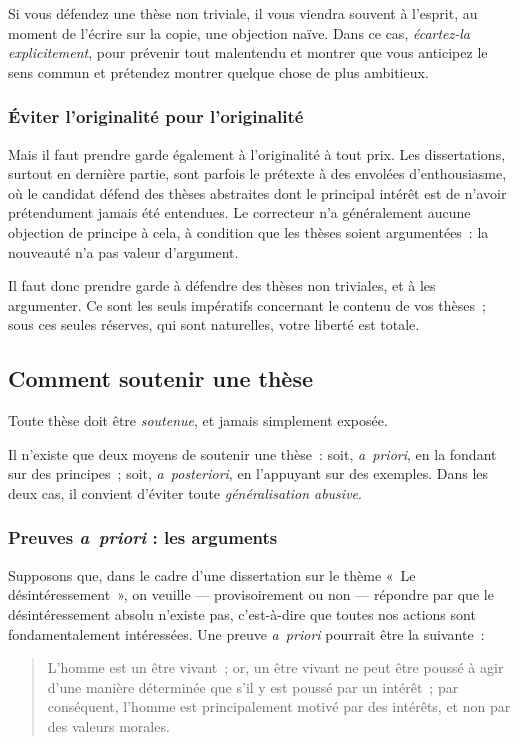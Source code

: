 \documentclass[a4paper]{article}
\begin{document}
Si vous défendez une thèse non triviale, il vous viendra souvent à
l'esprit, au moment de l'écrire sur la copie, une objection naïve. Dans
ce cas, \emph{écartez-la explicitement}, pour prévenir tout malentendu et
montrer que vous anticipez le sens commun et prétendez montrer quelque
chose de plus ambitieux.
\subsubsection{Éviter l'originalité pour l'originalité}
\label{sec-3-2-4}


Mais il faut prendre garde également à l'originalité à tout prix. Les
dissertations, surtout en dernière partie, sont parfois le prétexte à
des envolées d'enthousiasme, où le candidat défend des thèses abstraites
dont le principal intérêt est de n'avoir prétendument jamais été
entendues. Le correcteur n'a généralement aucune objection de principe à
cela, à condition que les thèses soient argumentées : la nouveauté n'a
pas valeur d'argument.

Il faut donc prendre garde à défendre des thèses non triviales, et à les
argumenter. Ce sont les seuls impératifs concernant le contenu de vos
thèses ; sous ces seules réserves, qui sont naturelles, votre liberté
est totale.
\subsection{Comment soutenir une thèse}
\label{sec-3-3}


Toute thèse doit être \emph{soutenue}, et jamais simplement exposée.

Il n'existe que deux moyens de soutenir une thèse : soit, \emph{a priori}, en
la fondant sur des principes ; soit, \emph{a posteriori}, en l'appuyant sur
des exemples. Dans les deux cas, il convient d'éviter toute
\emph{généralisation abusive}.
\subsubsection{Preuves \emph{a priori} : les arguments}
\label{sec-3-3-1}


Supposons que, dans le cadre d'une dissertation sur le thème « Le
désintéressement », on veuille --- provisoirement ou non --- répondre par
que le désintéressement absolu n'existe pas, c'est-à-dire que toutes nos
actions sont fondamentalement intéressées. Une preuve \emph{a priori}
pourrait être la suivante :

\begin{quote}
L'homme est un être vivant ; or, un être vivant ne peut être poussé à
agir d'une manière déterminée que s'il y est poussé par un intérêt ;
par conséquent, l'homme est principalement motivé par des intérêts, et
non par des valeurs morales.
\end{quote}
\end{document}
